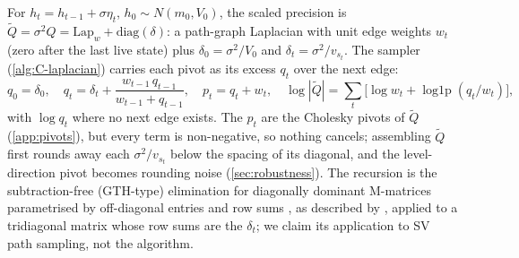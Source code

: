 For $h_t = h_{t-1} + \sigma\eta_t$, $h_0 \sim N(m_0, V_0)$, the scaled precision is
$\tilde Q = \sigma^2 Q = \mathrm{Lap}_w + \mathrm{diag}(\delta)$: a path-graph Laplacian with unit edge
weights $w_t$ (zero after the last live state) plus $\delta_0 = \sigma^2/V_0$ and
$\delta_t = \sigma^2/v_{s_t}$.
The sampler (\cref{alg:C-laplacian}) carries each pivot as its excess $q_t$ over the next edge:
\begin{equation}\label{eq:excess-pivot}
  q_0 = \delta_0, \quad
  q_t = \delta_t + \frac{w_{t-1}\,q_{t-1}}{w_{t-1} + q_{t-1}}, \quad
  p_t = q_t + w_t, \quad
  \log|\tilde Q| = \sum_t \bigl[\log w_t + \operatorname{log1p}(q_t/w_t)\bigr],
\end{equation}
with $\log q_t$ where no next edge exists.
The $p_t$ are the Cholesky pivots of $\tilde Q$ (\cref{app:pivots}), but every term is
non-negative, so nothing cancels; assembling $\tilde Q$ first rounds away each $\sigma^2/v_{s_t}$ below
the spacing of its diagonal, and the level-direction pivot becomes rounding noise
(\cref{sec:robustness}). %
The recursion is the subtraction-free (GTH-type) elimination for diagonally dominant M-matrices
parametrised by off-diagonal entries and row sums
\citep{grassmann1985regenerative,ocinneide1996relative,alfa2002accurate,ye2008computing}, as described
by \citet[Section~2.3.4]{demmel2008accurate}, applied to a tridiagonal matrix whose row sums are the
$\delta_t$; we claim its application to SV path sampling, not the algorithm.

